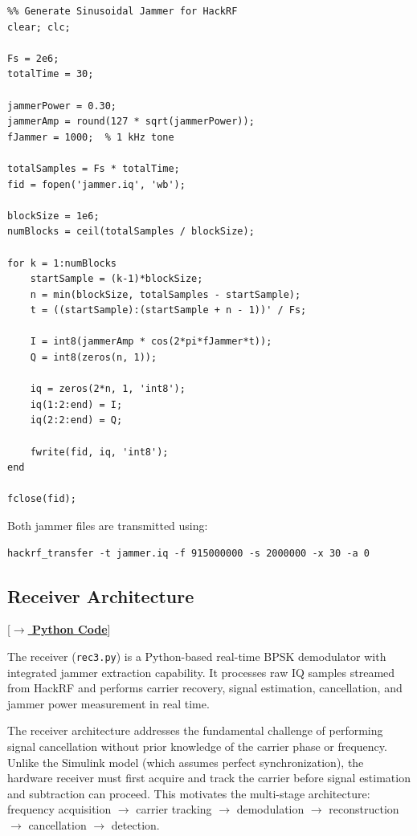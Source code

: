 \documentclass{article}
\begin{document}
\begin{verbatim}
%% Generate Sinusoidal Jammer for HackRF
clear; clc;

Fs = 2e6;
totalTime = 30;

jammerPower = 0.30;
jammerAmp = round(127 * sqrt(jammerPower));
fJammer = 1000;  % 1 kHz tone

totalSamples = Fs * totalTime;
fid = fopen('jammer.iq', 'wb');

blockSize = 1e6;
numBlocks = ceil(totalSamples / blockSize);

for k = 1:numBlocks
    startSample = (k-1)*blockSize;
    n = min(blockSize, totalSamples - startSample);
    t = ((startSample):(startSample + n - 1))' / Fs;

    I = int8(jammerAmp * cos(2*pi*fJammer*t));
    Q = int8(zeros(n, 1));

    iq = zeros(2*n, 1, 'int8');
    iq(1:2:end) = I;
    iq(2:2:end) = Q;

    fwrite(fid, iq, 'int8');
end

fclose(fid);
\end{verbatim}

Both jammer files are transmitted using:

\begin{verbatim}
hackrf_transfer -t jammer.iq -f 915000000 -s 2000000 -x 30 -a 0
\end{verbatim}

\subsection{Receiver Architecture} [\hyperref[lst:rec3]{\textbf{$\rightarrow$ Python Code}}]

The receiver (\texttt{rec3.py}) is a Python-based real-time BPSK demodulator with integrated jammer extraction capability. It processes raw IQ samples streamed from HackRF and performs carrier recovery, signal estimation, cancellation, and jammer power measurement in real time.

The receiver architecture addresses the fundamental challenge of performing signal cancellation without prior knowledge of the carrier phase or frequency. Unlike the Simulink model (which assumes perfect synchronization), the hardware receiver must first acquire and track the carrier before signal estimation and subtraction can proceed. This motivates the multi-stage architecture: frequency acquisition $\rightarrow$ carrier tracking $\rightarrow$ demodulation $\rightarrow$ reconstruction $\rightarrow$ cancellation $\rightarrow$ detection.
\end{document}
